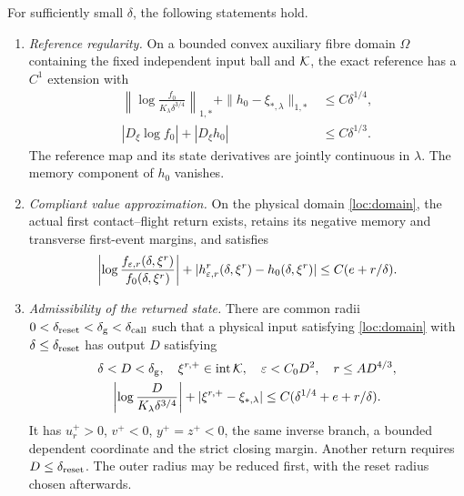 \begin{proposition}
\label{loc:return}
For sufficiently small $\delta$, the following statements hold.
\begin{enumerate}[label=\textup{(\roman*)}]
\item \emph{Reference regularity.} On a bounded convex auxiliary fibre
domain $\Omega$ containing the fixed independent input ball and $\mathcal K$,
the exact reference has a $C^1$ extension with
\begin{equation}
 \begin{aligned}
 \left\|\log\frac{f_0}{K_\lambda\delta^{3/4}}\right\|_{1,*}
       +\|h_0-\xi_{*,\lambda}\|_{1,*}&\le C\delta^{1/4},\\
 |D_\xi\log f_0|+|D_\xi h_0|&\le C\delta^{1/3}.
 \end{aligned}
 \label{loc:factorization}
\end{equation}
The reference map and its state derivatives are jointly continuous in
$\lambda$. The memory component of $h_0$ vanishes.
\item \emph{Compliant value approximation.} On the physical domain
\eqref{loc:domain},
the actual first contact--flight return exists, retains its negative
memory and transverse first-event margins, and satisfies
\begin{equation}
 \left|\log\frac{f_{\varepsilon,r}(\delta,\xi^r)}{f_0(\delta,\xi^r)}\right|
 +|h_{\varepsilon,r}^r(\delta,\xi^r)-h_0(\delta,\xi^r)|
 \le C(e+r/\delta).
 \label{loc:value}
\end{equation}
\item \emph{Admissibility of the returned state.} There are common radii
$0<\delta_{\rm reset}<\delta_{\rm g}<\delta_{\rm call}$ such that
a physical input satisfying \eqref{loc:domain} with
$\delta\le\delta_{\rm reset}$ has output $D$ satisfying
\begin{equation}
 \begin{gathered}
 \delta<D<\delta_{\rm g},\quad \xi^{r,+}\in\operatorname{int}\mathcal K,
 \quad \varepsilon<C_0D^2,\quad r\le AD^{4/3},\\
 \left|\log\frac D{K_\lambda\delta^{3/4}}\right|
       +|\xi^{r,+}-\xi_{*,\lambda}|
       \le C(\delta^{1/4}+e+r/\delta).
 \label{loc:admission}
 \end{gathered}
\end{equation}
It has $u_r^+>0$, $v^+<0$, $y^+=z^+<0$, the same inverse branch,
a bounded dependent coordinate and the strict closing margin.
Another return requires $D\le\delta_{\rm reset}$.
The outer radius may be reduced first, with the reset radius chosen
afterwards.
\end{enumerate}
\end{proposition}


